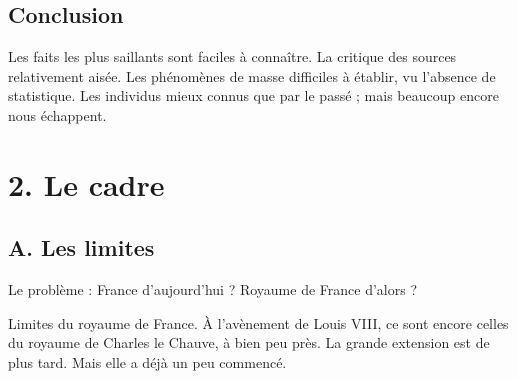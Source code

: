 \documentclass[french,twoside]{book} %
\newcommand\chapteropen{} %
\newcommand\chaptercont{} %
\newcommand\chapterclose{} %
\begin{document}
\section[Conclusion]{Conclusion}
\noindent Les faits les plus saillants sont faciles à connaître. La critique des sources relativement aisée. Les phénomènes de masse difficiles à établir, vu l’absence de statistique. Les individus mieux connus que par le passé ; mais beaucoup encore nous échappent.
\chapterclose


\chapteropen
\chapter[2. Le cadre]{\textsc{2. }Le cadre}
\label{c02}

\chaptercont
\section[A. Les limites]{A. Les limites}
\label{c02a}
\noindent  {}
\label{p7} Le problème : France d’aujourd’hui ? Royaume de France d’alors ?\par
Limites du royaume de France. À l’avènement de Louis VIII, ce sont encore celles du royaume de Charles le Chauve, à bien peu près. La grande extension est de plus tard. Mais elle a déjà un peu commencé.\par
\end{document}
